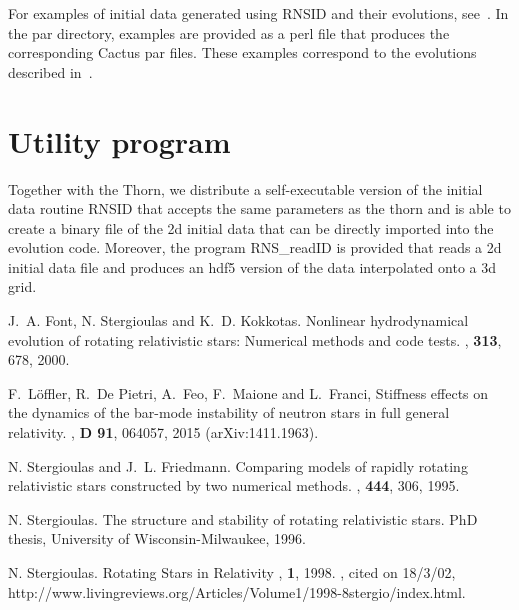 For examples of initial data generated using RNSID and their
evolutions, see~\cite{rotns1,rotns2}. In the par directory, examples
are provided as a perl file that produces the corresponding Cactus par
files. These examples correspond to the evolutions described
in~\cite{rotns1,rotns2}.

\section{Utility program}

Together with the Thorn, we distribute a self-executable version of
the initial data routine RNSID that accepts the same parameters as the
thorn and is able to create a binary file of the 2d initial data that
can be directly imported into the evolution code. Moreover, the
program RNS\_readID is provided that reads a 2d initial data file and
produces an hdf5 version of the data interpolated onto a 3d grid.


\begin{thebibliography}{1}

J.~A. Font, N. Stergioulas and K.~D. Kokkotas.
\newblock Nonlinear hydrodynamical evolution of rotating relativistic
stars: Numerical methods and code tests.
, {\bf 313}, 678, 2000.

F.~L\"offler, R.~De Pietri, A.~Feo, F.~Maione and L.~Franci, 
\newblock Stiffness effects on the dynamics of the bar-mode instability 
of neutron stars in full general relativity. 
, {\bf D 91}, 064057, 2015 (arXiv:1411.1963).

N. Stergioulas and J.~L. Friedmann.
\newblock Comparing models of rapidly rotating relativistic stars
constructed by two numerical methods.
, {\bf 444}, 306, 1995.

N. Stergioulas.
\newblock The structure and stability of rotating relativistic stars.
\newblock PhD thesis, University of Wisconsin-Milwaukee, 1996.

N. Stergioulas.
\newblock Rotating Stars in Relativity
, {\bf 1}, 1998.
, cited on 18/3/02,
  http://www.livingreviews.org/Articles/Volume1/1998-8stergio/index.html.

\end{thebibliography}




